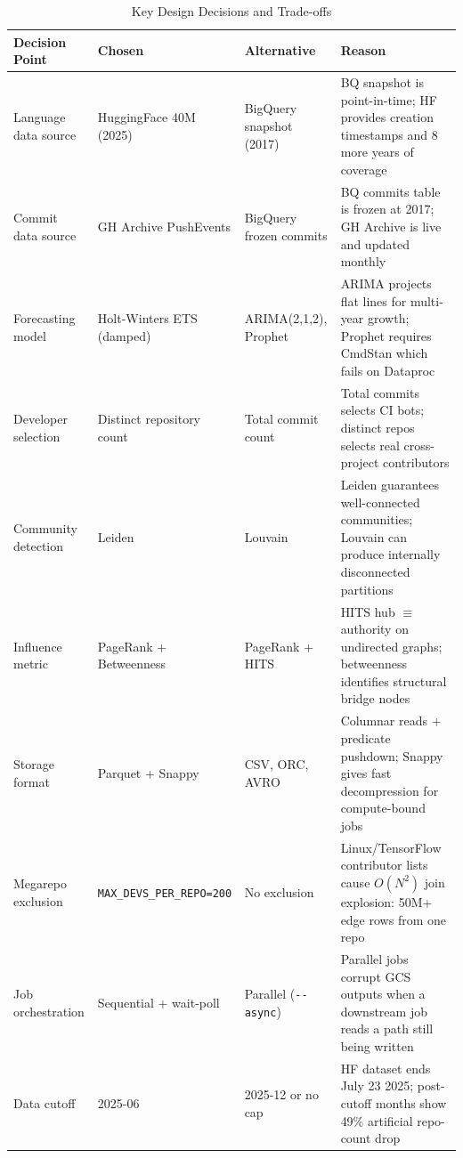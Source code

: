 \documentclass[conference]{IEEEtran}
\begin{document}
\begin{table}[!t]
\caption{Key Design Decisions and Trade-offs}
\label{tab:decisions}
\centering\small
\begin{tabular}{p{2.4cm} p{3.0cm} p{3.0cm} p{6.8cm}}
\toprule
\textbf{Decision Point} & \textbf{Chosen} & \textbf{Alternative} & \textbf{Reason} \\
\midrule
Language data source & HuggingFace 40M (2025) & BigQuery snapshot (2017) &
  BQ snapshot is point-in-time; HF provides creation timestamps and 8 more years of coverage \\
\addlinespace
Commit data source & GH Archive PushEvents & BigQuery frozen commits &
  BQ commits table is frozen at 2017; GH Archive is live and updated monthly \\
\addlinespace
Forecasting model & Holt-Winters ETS (damped) & ARIMA(2,1,2), Prophet &
  ARIMA projects flat lines for multi-year growth; Prophet requires CmdStan which fails on Dataproc \\
\addlinespace
Developer selection & Distinct repository count & Total commit count &
  Total commits selects CI bots; distinct repos selects real cross-project contributors \\
\addlinespace
Community detection & Leiden & Louvain &
  Leiden guarantees well-connected communities; Louvain can produce internally disconnected partitions \\
\addlinespace
Influence metric & PageRank + Betweenness & PageRank + HITS &
  HITS hub $\equiv$ authority on undirected graphs; betweenness identifies structural bridge nodes \\
\addlinespace
Storage format & Parquet + Snappy & CSV, ORC, AVRO &
  Columnar reads + predicate pushdown; Snappy gives fast decompression for compute-bound jobs \\
\addlinespace
Megarepo exclusion & \texttt{MAX\_DEVS\_}\newline\texttt{PER\_REPO=200} & No exclusion &
  Linux/TensorFlow contributor lists cause $O(N^2)$ join explosion: 50M+ edge rows from one repo \\
\addlinespace
Job orchestration & Sequential + wait-poll & Parallel (\texttt{-{}-async}) &
  Parallel jobs corrupt GCS outputs when a downstream job reads a path still being written \\
\addlinespace
Data cutoff & 2025-06 & 2025-12 or no cap &
  HF dataset ends July 23 2025; post-cutoff months show 49\% artificial repo-count drop \\
\bottomrule
\end{tabular}
\end{table}
\end{document}
